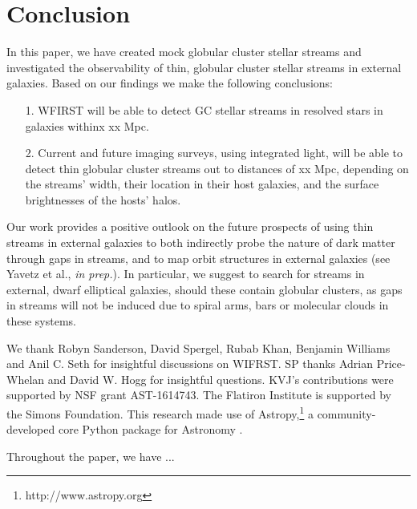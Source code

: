 \documentclass[twocolumn]{aastex62}
\newcommand{\package}[1]{\textsl{#1}}
\begin{document}
\section{Conclusion}\label{sec:conclusion}
In this paper, we have created mock globular cluster stellar streams and investigated the observability of thin, globular cluster stellar streams in external galaxies. Based on our findings we make the following conclusions:

\begin{itemize}
\item[1.]  WFIRST will be able to detect GC stellar streams in resolved stars in galaxies withinx xx Mpc.
\item[2.]  Current and future imaging surveys, using integrated light, will be able to detect thin globular cluster streams out to distances of xx Mpc, depending on the streams' width, their location in their host galaxies, and the surface brightnesses of the hosts' halos. 
\end{itemize}


Our work provides a positive outlook on the future prospects of using thin streams in external galaxies to both indirectly probe the nature of dark matter through gaps in streams, and to map orbit structures in external galaxies (see Yavetz et al., {\it in prep.}). In particular, we suggest to search for streams in external, dwarf elliptical galaxies, should these contain globular clusters, as gaps in streams will not be induced due to spiral arms, bars or molecular clouds in these systems. 

\acknowledgements
We thank Robyn Sanderson, David Spergel, Rubab Khan, Benjamin Williams and Anil C. Seth for insightful discussions on WIFRST. SP thanks Adrian Price-Whelan and David W. Hogg for insightful questions. KVJ's contributions were supported by NSF grant AST-1614743. The Flatiron Institute is supported by the Simons Foundation. This research made use of Astropy,\footnote{http://www.astropy.org} a community-developed core Python package for Astronomy \citep{astropy:2013, astropy:2018}.

\appendix\label{sec:appendix}
Throughout the paper, we have ...



\software{
    \package{Astropy} \citep{astropy:2013, astropy:2018},
    \package{matplotlib} \citep{Hunter:2007},
    \package{numpy} \citep{walt2011},
}



\end{document}
